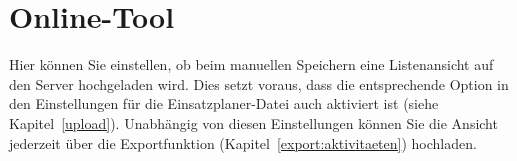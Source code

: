 \section{Online-Tool}
Hier können Sie einstellen, ob beim manuellen Speichern eine Listenansicht auf den Server hochgeladen wird.
Dies setzt voraus, dass die entsprechende Option in den Einstellungen für die Einsatzplaner-Datei auch aktiviert ist
(siehe Kapitel~\ref{upload}).
Unabhängig von diesen Einstellungen können Sie die Ansicht jederzeit über die Exportfunktion (Kapitel~\ref{export:aktivitaeten}) hochladen.


\section{}
